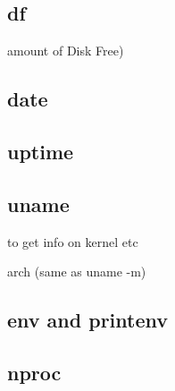 
\subsection{df}

amount of Disk Free)
 
\subsection{date}

\subsection{uptime}

\subsection{uname}

to get info on kernel etc

arch (same as uname -m)

\subsection{env and printenv}

\subsection{nproc}


